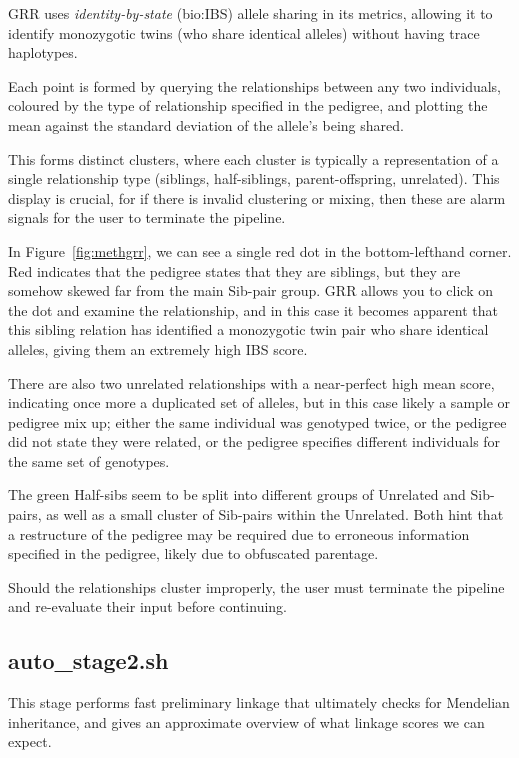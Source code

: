 GRR uses \textit{identity-by-state} (\gls{bio:IBS}) allele sharing in its metrics, allowing it to identify monozygotic twins (who share identical alleles) without having trace haplotypes. 

Each point is formed by querying the relationships between any two individuals, coloured by the type of relationship specified in the pedigree, and plotting the mean against the standard deviation of the allele's being shared.

This forms distinct clusters, where each cluster is typically a representation of a single relationship type (siblings, half-siblings, parent-offspring, unrelated). This display is crucial, for if there is invalid clustering or mixing, then these are alarm signals for the user to terminate the pipeline.

In Figure~\ref{fig:methgrr}, we can see a single red dot in the bottom-lefthand corner. Red indicates that the pedigree states that they are siblings, but they are somehow skewed far from the main Sib-pair group. GRR allows you to click on the dot and examine the relationship, and in this case it becomes apparent that this sibling relation has identified a monozygotic twin pair who share identical alleles, giving them an extremely high IBS score.

There are also two unrelated relationships with a near-perfect high mean score, indicating once more a duplicated set of alleles, but in this case likely a sample or pedigree mix up; either the same individual was genotyped twice, or the pedigree did not state they were related, or the pedigree specifies different individuals for the same set of genotypes.

The green Half-sibs seem to be split into different groups of Unrelated and Sib-pairs, as well as a small cluster of Sib-pairs within the Unrelated. Both hint that a restructure of the pedigree may be required due to erroneous information specified in the pedigree, likely due to obfuscated parentage.

Should the relationships cluster improperly, the user must terminate the pipeline and re-evaluate their input before continuing.


\subsection{auto\_stage2.sh}

This stage performs fast preliminary linkage that ultimately checks for Mendelian inheritance, and gives an approximate overview of what linkage scores we can expect.

